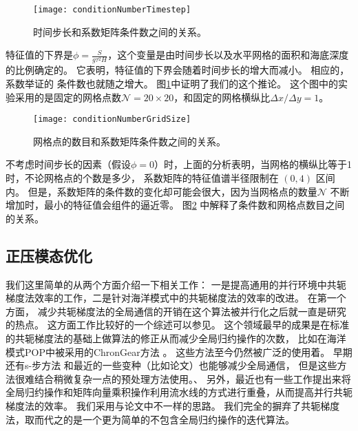 \begin{figure}[ht]
\centering
\texttt{[image: conditionNumberTimestep]}
\caption[] {时间步长和系数矩阵条件数之间的关系。 \label{fig:conditionNumberDt}}
\end{figure}



特征值的下界是$\phi=\frac{S }{g \tau^2 H}$，这个变量是由时间步长以及水平网格的面积和海底深度的比例确定的。
它表明，特征值的下界会随着时间步长的增大而减小。 
相应的，系数举证的 条件数也就随之增大。
图\ref{fig:conditionNumberDt}中证明了我们的这个推论。
这个图中的实验采用的是固定的网格点数$\mathcal{N} = 20\times 20$，和固定的网格横纵比$\Delta x /{\Delta y} = 1$。 

\begin{figure}[ht]
\centering
\texttt{[image: conditionNumberGridSize]}
\caption[] {网格点的数目和系数矩阵条件数之间的关系。 \label{fig:conditionNumbGrid}}
\end{figure}
 
不考虑时间步长的因素（假设$\phi=0$）时，上面的分析表明，当网格的横纵比等于1时，不论网格点的个数是多少， 系数矩阵的特征值谱半径限制在 $(0,4)$ 区间内。
但是，系数矩阵的条件数的变化却可能会很大，因为当网格点的数量$\mathcal{N}$ 不断增加时，最小的特征值会组件的逼近零。 
图\ref{fig:conditionNumbGrid} 中解释了条件数和网格点数目之间的关系。 



\subsection{正压模态优化}
\label{related:precond}

我们这里简单的从两个方面介绍一下相关工作： 一是提高通用的并行环境中共轭梯度法效率的工作，二是针对海洋模式中的共轭梯度法的效率的改进。
在第一个方面， 减少共轭梯度法的全局通信的开销在这个算法被并行化之后就一直是研究的热点。 
这方面工作比较好的一个综述可以参见\cite{ghysels2014}。 
这个领域最早的成果是在标准的共轭梯度法的基础上做算法的修正从而减少全局归约操作的次数， 比如在海洋模式POP中被采用的ChronGear方法\cite{dAzevedo1999lapack} 。 这些方法至今仍然被广泛的使用着。 
早期还有s-步方法\cite{chron1989} 和最近的一些变种（比如论文）也能够减少全局通信， 但是这些方法很难结合稍微复杂一点的预处理方法使用。、
另外，最近也有一些工作提出来将全局归约操作和矩阵向量乘积操作利用流水线的方式进行重叠\cite{ghysels2014}，从而提高并行共轭梯度法的效率。  
我们采用与论文中不一样的思路。
我们完全的摒弃了共轭梯度法，取而代之的是一个更为简单的不包含全局归约操作的迭代算法。 



